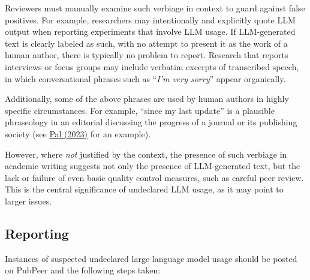 \documentclass[letterpaper, 12pt]{article}
\begin{document}

Reviewers must manually examine such verbiage in context to guard against false positives. For example, researchers may intentionally and explicitly quote LLM output when reporting experiments that involve LLM usage. If LLM-generated text is clearly labeled as such, with no attempt to present it as the work of a human author, there is typically no problem to report. Research that reports interviews or focus groups may include verbatim excerpts of transcribed speech, in which conversational phrases such as ``\textit{I'm very sorry}'' appear organically. 

Additionally, some of the above phrases are used by human authors in highly specific circumstances. For example, ``since my last update'' is a plausible
phraseology in an editorial discussing the progress of a journal or its publishing society (see \href{https://doi.org/10.1177/20501684231158466}{Pal (2023)} for an example).

However, where \emph{not} justified by the context, the presence of such verbiage in academic writing suggests not only the presence of LLM-generated text, but the lack or failure of even basic quality control measures, such as careful peer review. This is the central significance of undeclared LLM usage, as it may point to larger issues.

\subsection*{Reporting}\label{reporting}

Instances of suspected undeclared large language model usage should be posted on PubPeer and the following steps taken:
\end{document}
